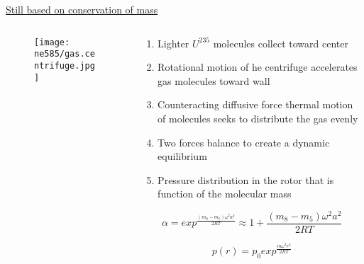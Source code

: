 \documentclass[aspectratio=1610,pdftex,dvipsnames,compress,xcolor={dvipsnames}]{beamer}
\begin{document}
\begin{frame}{\href{https://uidaho.pressbooks.pub/nuclearengineering/chapter/front-end-of-the-fuel-cycle/}{Still based on conservation of mass}}
    \begin{columns}[t]

        \begin{column}{0.35\textwidth}
            \begin{figure}
                \centering
                \texttt{[image: ne585/gas.centrifuge.jpg]}
            \end{figure}
        \end{column}

        \begin{column}{0.65\textwidth}
            \begin{enumerate}[series=outerlist,topsep=0pt,itemsep=7pt,leftmargin=*,label=(\arabic*)]
                \item[]Lighter $U^{235}$ molecules collect toward center
                \item[]Rotational motion of he centrifuge accelerates gas molecules toward  wall
                \item[]Counteracting diffusive force thermal motion of molecules seeks to distribute the gas evenly
                \item[]Two forces balance to create a dynamic equilibrium
                \item[]Pressure distribution in the rotor that is function of the molecular mass
            \end{enumerate}
            
            \vspace*{\fill}

            \begin{equation}
                \alpha = exp^{\frac{(m_8-m_5) \omega^2 a^2}{2RT}} \approx 1 + \frac{(m_8-m_5) \omega^2 a^2}{2RT}
            \end{equation}
            
            \begin{equation}
                p(r) = p_0 exp^{\frac{m \omega^2 r^2}{2RT}}
            \end{equation}
        \end{column}

    \end{columns}
\end{frame}
\end{document}
